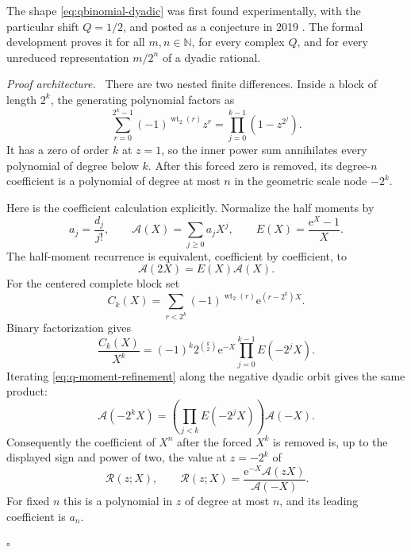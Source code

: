 \documentclass[11pt,oneside]{article}
\theoremstyle{definition}
\theoremstyle{remark}
\newcommand{\N}{\mathbb N}
\newcommand{\wt}{\operatorname{wt}_2}
\newcommand{\e}{\mathrm e}
\newenvironment{proofidea}{\par\smallskip\noindent\textit{Proof architecture.}\ }{\hfill$\square$\par\smallskip}
\begin{document}
The shape \eqref{eq:qbinomial-dyadic} was first found experimentally, with the particular
shift $Q=1/2$, and posted as a conjecture in 2019 \cite{reshetnikovMSE}.  The formal
development proves it for all $m,n\in\N$, for every complex $Q$, and for every
unreduced representation $m/2^n$ of a dyadic rational.

\begin{proofidea}
There are two nested finite differences.  Inside a block of length $2^k$, the generating
polynomial factors as
\begin{equation}
 \sum_{r=0}^{2^k-1}(-1)^{\wt(r)}z^r
 =\prod_{j=0}^{k-1}(1-z^{2^j}).                           \label{eq:thue-generating-product}
\end{equation}
It has a zero of order $k$ at $z=1$, so the inner power sum annihilates every polynomial
of degree below $k$.  After this forced zero is removed, its degree-$n$ coefficient is a
polynomial of degree at most $n$ in the geometric scale node $-2^k$.

Here is the coefficient calculation explicitly.  Normalize the half moments by
\begin{equation*}
 a_j=\frac{d_j}{j!},\qquad
 \mathscr A(X)=\sum_{j\ge0}a_jX^j,\qquad
 E(X)=\frac{\e^X-1}{X}.
\end{equation*}
The half-moment recurrence is equivalent, coefficient by coefficient, to
\begin{equation}
 \mathscr A(2X)=E(X)\mathscr A(X).                        \label{eq:q-moment-refinement}
\end{equation}
For the centered complete block set
\begin{equation*}
 C_k(X)=\sum_{r<2^k}(-1)^{\wt(r)}\e^{(r-2^k)X}.
\end{equation*}
Binary factorization gives
\begin{equation}
 \frac{C_k(X)}{X^k}
 =(-1)^k2^{\binom k2}\e^{-X}
 \prod_{j=0}^{k-1}E(-2^jX).                              \label{eq:q-centered-block-factor}
\end{equation}
Iterating \eqref{eq:q-moment-refinement} along the negative dyadic orbit gives the same
product:
\begin{equation*}
 \mathscr A(-2^kX)=
 \left(\prod_{j<k}E(-2^jX)\right)\mathscr A(-X).
\end{equation*}
Consequently the coefficient of $X^n$ after the forced $X^k$ is removed is, up to the
displayed sign and power of two, the value at $z=-2^k$ of
\begin{equation*}
 [X^n]\,\mathscr R(z;X),\qquad
 \mathscr R(z;X)=\frac{\e^{-X}\mathscr A(zX)}{\mathscr A(-X)}.
\end{equation*}
For fixed $n$ this is a polynomial in $z$ of degree at most $n$, and its leading
coefficient is $a_n$.


\end{proofidea}
\end{document}
